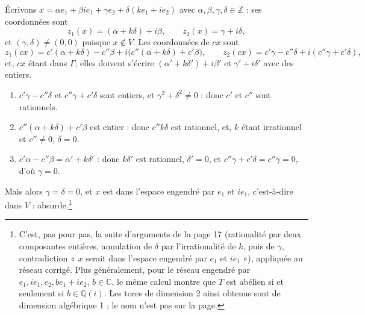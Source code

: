 \documentclass[11pt,a4paper]{article}
\begin{document}
Écrivons $x = \alpha e_{1} + \beta ie_{1} + \gamma e_{2} + \delta(ke_{1} +
ie_{2})$ avec $\alpha, \beta, \gamma, \delta \in \mathbb{Z}$ : ses coordonnées
sont
\[
  z_{1}(x) = (\alpha + k\delta) + i\beta, \qquad z_{2}(x) = \gamma + i\delta,
\]
et $(\gamma, \delta) \neq (0, 0)$ puisque $x \notin V$. Les coordonnées de
$cx$ sont
\[
  z_{1}(cx) = c'(\alpha + k\delta) - c''\beta + i\bigl(c''(\alpha + k\delta)
  + c'\beta\bigr),
  \qquad
  z_{2}(cx) = c'\gamma - c''\delta + i(c''\gamma + c'\delta),
\]
et, $cx$ étant dans $\Gamma$, elles doivent s'écrire $(\alpha' + k\delta') +
i\beta'$ et $\gamma' + i\delta'$ avec des entiers.

\begin{enumerate}
\item[1.] $c'\gamma - c''\delta$ et $c''\gamma + c'\delta$ sont entiers, et
$\gamma^{2} + \delta^{2} \neq 0$ : donc $c'$ et $c''$ sont rationnels.
\item[2.] $c''(\alpha + k\delta) + c'\beta$ est entier : donc $c''k\delta$ est
rationnel, et, $k$ étant irrationnel et $c'' \neq 0$, $\delta = 0$.
\item[3.] $c'\alpha - c''\beta = \alpha' + k\delta'$ : donc $k\delta'$ est
rationnel, $\delta' = 0$, et $c''\gamma + c'\delta = c''\gamma = 0$, d'où
$\gamma = 0$.
\end{enumerate}

Mais alors $\gamma = \delta = 0$, et $x$ est dans l'espace engendré par
$e_{1}$ et $ie_{1}$, c'est-à-dire dans $V$ : absurde.\footnote{C'est, pas pour
pas, la suite d'arguments de la page 17 (rationalité par deux composantes
entières, annulation de $\delta$ par l'irrationalité de $k$, puis de $\gamma$,
contradiction « $x$ serait dans l'espace engendré par $e_{1}$ et $ie_{1}$ »),
appliquée au réseau corrigé. Plus généralement, pour le réseau engendré par
$e_{1}, ie_{1}, e_{2}, be_{1} + ie_{2}$, $b \in \mathbb{C}$, le même calcul
montre que $T$ est abélien si et seulement si $b \in \mathbb{Q}(i)$. Les tores
de dimension 2 ainsi obtenus sont de dimension algébrique 1 ; le nom n'est pas
sur la page.}
\end{document}
